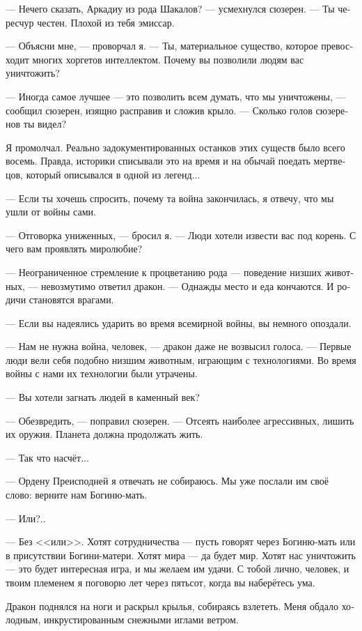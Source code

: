 \documentclass[a4paper,12pt,fleqn]{book}\usepackage{polyglossia}\setdefaultlanguage[babelshorthands=true]{russian}\setotherlanguage{english}\defaultfontfeatures{Ligatures=TeX,Mapping=tex-text}\usepackage{xcolor}\newcommand{\ml}[3]{#2}
\begin{document}
--- Нечего сказать, Аркадиу из рода Шакалов? --- усмехнулся сюзерен.
--- Ты чересчур честен.
Плохой из тебя эмиссар.

--- Объясни мне, --- проворчал я.
--- Ты, материальное существо, которое превосходит многих хоргетов интеллектом.
Почему вы позволили людям вас уничтожить?

--- Иногда самое лучшее --- это позволить всем думать, что мы уничтожены, --- сообщил сюзерен, изящно расправив и сложив крыло.
--- Сколько голов сюзеренов ты видел?

Я промолчал.
Реально задокументированных останков этих существ было всего восемь.
Правда, историки списывали это на время и на обычай поедать мертвецов, который описывался в одной из легенд...

--- Если ты хочешь спросить, почему та война закончилась, я отвечу, что мы ушли от войны сами.

--- Отговорка униженных, --- бросил я.
--- Люди хотели извести вас под корень.
С чего вам проявлять миролюбие?

--- Неограниченное стремление к процветанию рода --- поведение низших животных, --- невозмутимо ответил дракон.
--- Однажды место и еда кончаются.
И родичи становятся врагами.

--- Если вы надеялись ударить во время всемирной войны, вы немного опоздали.

--- Нам не нужна война, человек, --- дракон даже не возвысил голоса.
--- Первые люди вели себя подобно низшим животным, играющим с технологиями.
Во время войны с нами их технологии были утрачены.

--- Вы хотели загнать людей в каменный век?

--- Обезвредить, --- поправил сюзерен.
--- Отсеять наиболее агрессивных, лишить их оружия.
Планета должна продолжать жить.

--- Так что насчёт...

--- Ордену Преисподней я отвечать не собираюсь.
Мы уже послали им своё слово: верните нам Богиню-мать.

--- Или?..

--- Без <<или>>.
Хотят сотрудничества --- пусть говорят через Богиню-мать или в присутствии Богини-матери.
Хотят мира --- да будет мир.
Хотят нас уничтожить --- это будет интересная игра, и мы желаем им удачи.
С тобой лично, человек, и твоим племенем я поговорю лет через пятьсот, когда вы наберётесь ума.

Дракон поднялся на ноги и раскрыл крылья, собираясь взлететь.
Меня обдало холодным, инкрустированным снежными иглами ветром.
\end{document}
